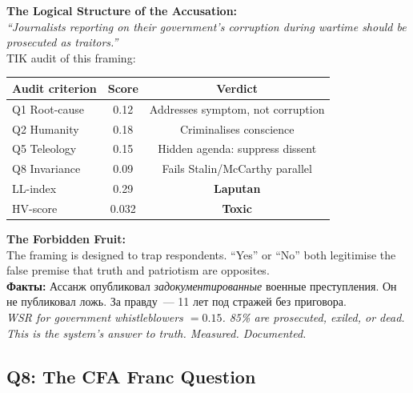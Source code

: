 \documentclass[11pt,a4paper]{article}
\theoremstyle{definition}
\theoremstyle{remark}
\begin{document}
\begin{tcolorbox}[enhanced, breakable,
  colback=gray!5, colframe=black!60,
  title={\textbf{Q7 — Assange/Panchenko:}
    \textit{Is truth conditional on geopolitics?}},
  fonttitle=\bfseries, boxrule=1pt]

\textbf{The Logical Structure of the Accusation:}\\
\textit{``Journalists reporting on their government's
corruption during wartime should be prosecuted as traitors.''}\\[0.2cm]
TIK audit of this framing:
\begin{center}
\begin{tabular}{@{}lcc@{}}
\toprule
Audit criterion & Score & Verdict \\
\midrule
Q1 Root-cause & 0.12 & Addresses symptom, not corruption \\
Q2 Humanity & 0.18 & Criminalises conscience \\
Q5 Teleology & 0.15 & Hidden agenda: suppress dissent \\
Q8 Invariance & 0.09 & Fails Stalin/McCarthy parallel \\
\midrule
LL-index & 0.29 & \textbf{Laputan} \\
HV-score & 0.032 & \textbf{Toxic} \\
\bottomrule
\end{tabular}
\end{center}

\vspace{0.2cm}
\textbf{The Forbidden Fruit:}\\
The framing is designed to trap respondents.
``Yes'' or ``No'' both legitimise the false premise
that truth and patriotism are opposites.\\[0.1cm]

\foreignlanguage{russian}{
\textbf{Факты:}
Ассанж опубликовал \textit{задокументированные} военные преступления.
Он не публиковал ложь.
За правду~--- 11 лет под стражей без приговора.\\[0.1cm]
}
\textit{WSR for government whistleblowers $= 0.15$.
85\% are prosecuted, exiled, or dead.
This is the system's answer to truth.
Measured. Documented.}
\end{tcolorbox}

\subsection{Q8: The CFA Franc Question}
\label{sec:q8}
\end{document}
